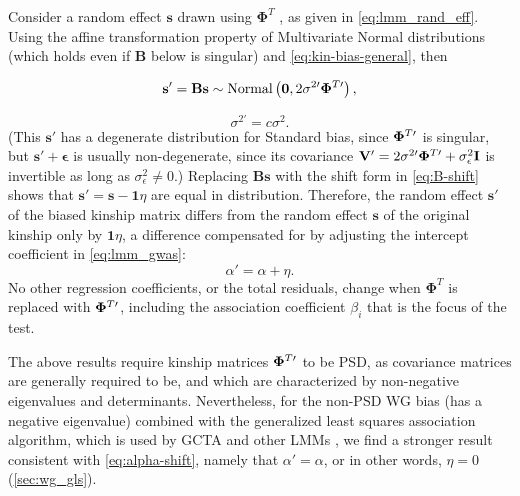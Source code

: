 \documentclass[11pt]{article}
\newcommand{\kinMat}[1][T]{%
  \ensuremath{%
    \mathbf{\Phi}^{#1}
  }%
  \xspace%
}%
\newcommand{\kinMatPrime}{%
  \ensuremath{%
    \mathbf{\Phi}^{T\prime}
  }%
  \xspace%
}%
\begin{document}
\begin{linenumbers}
Consider a random effect $\mathbf{s}$ drawn using \kinMat, as given in \cref{eq:lmm_rand_eff}.
Using the affine transformation property of Multivariate Normal distributions (which holds even if $\mathbf{B}$ below is singular) and \cref{eq:kin-bias-general}, then
\begin{linenomath*}
$$
\mathbf{s}'
=
\mathbf{B} \mathbf{s}
\sim
\text{Normal} \left( \mathbf{0}, 2 \sigma^{2\prime} \kinMatPrime \right),
$$
\end{linenomath*}
\begin{equation}
  \label{eq:sigma-rescale}
  \sigma^{2\prime} = c \sigma^2
  .
\end{equation}
(This $\mathbf{s}'$ has a degenerate distribution for Standard bias, since $\kinMatPrime$ is singular, but $\mathbf{s}' + \boldsymbol{\epsilon}$ is usually non-degenerate, since its covariance $\mathbf{V}' = 2 \sigma^{2\prime} \kinMatPrime + \sigma^2_\epsilon \mathbf{I}$ is invertible as long as $\sigma^2_\epsilon \ne 0$.)
Replacing $\mathbf{B} \mathbf{s}$ with the shift form in \cref{eq:B-shift} shows that
$\mathbf{s}' = \mathbf{s} - \mathbf{1} \eta$
are equal in distribution.
Therefore, the random effect $\mathbf{s}'$ of the biased kinship matrix differs from the random effect $\mathbf{s}$ of the original kinship only by $\mathbf{1} \eta$, a difference compensated for by adjusting the intercept coefficient in \cref{eq:lmm_gwas}:
\begin{equation}
  \label{eq:alpha-shift}
  \alpha' = \alpha + \eta.
\end{equation}
No other regression coefficients, or the total residuals, change when \kinMat is replaced with $\kinMatPrime$, including the association coefficient $\beta_i$ that is the focus of the test.

The above results require kinship matrices $\kinMatPrime$ to be PSD, as covariance matrices are generally required to be, and which are characterized by non-negative eigenvalues and determinants.
Nevertheless, for the non-PSD WG bias (has a negative eigenvalue) combined with the generalized least squares association algorithm, which is used by GCTA and other LMMs \citep{kang_efficient_2008, kang_variance_2010, yang_advantages_2014}, we find a stronger result consistent with \cref{eq:alpha-shift}, namely that $\alpha' = \alpha$, or in other words, $\eta = 0$ (\cref{sec:wg_gls}).


\end{linenumbers}
\end{document}

